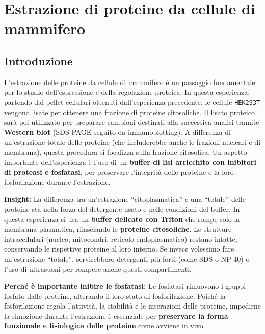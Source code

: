 \normalsize
\section {Estrazione di proteine da cellule di mammifero}

\subsection{Introduzione}
L’estrazione delle proteine da cellule di mammifero è un passaggio fondamentale per lo studio dell’espressione e della regolazione proteica.
In questa esperienza, partendo dai pellet cellulari ottenuti dall’esperienza precedente, le cellule \texttt{HEK293T} vengono lisate per ottenere una frazione di proteine citosoliche.
Il lisato proteico sarà poi utilizzato per preparare campioni destinati alla successiva analisi tramite \textbf{Western blot} (SDS-PAGE seguito da immunoblotting).
A differenza di un’estrazione totale delle proteine (che includerebbe anche le frazioni nucleari e di membrana), questa procedura si focalizza sulla frazione citosolica.
Un aspetto importante dell’esperienza è l’uso di un \textbf{buffer di lisi arricchito con inibitori di proteasi e fosfatasi}, per preservare l’integrità delle proteine e la loro fosforilazione durante l’estrazione.

\begin{insightBox}
	\textbf{Insight:} La differenza tra un’estrazione “citoplasmatica” e una “totale” delle proteine sta nella forza del detergente usato e nelle condizioni del buffer.
	In questa esperienza si usa un \textbf{buffer delicato con Triton} che rompe solo la membrana plasmatica, rilasciando le \textbf{proteine citosoliche}.
	Le strutture intracellulari (nucleo, mitocondri, reticolo endoplasmatico) restano intatte, conservando le rispettive proteine al loro interno.
	Se invece volessimo fare un’estrazione “totale”, servirebbero detergenti più forti (come SDS o NP-40) o l’uso di ultrasuoni per rompere anche questi compartimenti.
\end{insightBox}

\begin{percheBox}
	\textbf{Perché è importante inibire le fosfatasi:}
	Le fosfatasi rimuovono i gruppi fosfato dalle proteine, alterando il loro stato di fosforilazione.
	Poiché la fosforilazione regola l’attività, la stabilità e le interazioni delle proteine, impedirne la rimozione durante l’estrazione è essenziale per \textbf{preservare la forma funzionale e fisiologica delle proteine} come avviene in vivo.
\end{percheBox}


